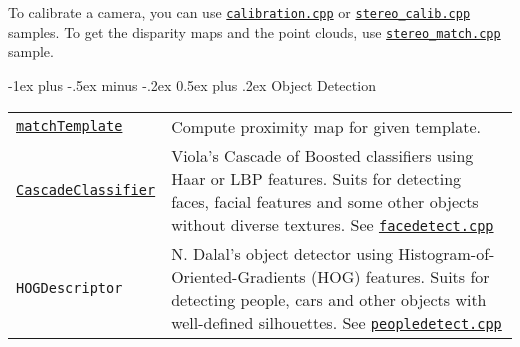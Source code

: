 \documentclass[10pt,landscape]{article}
\makeatletter
\renewcommand{\section}{\@startsection{section}{1}{0mm}%
                                {-1ex plus -.5ex minus -.2ex}%
                                {0.5ex plus .2ex}%
                                {\normalfont\large\bfseries}}
\makeatother
\begin{document}
\begin{multicols}{3}
\begin{tabular}{@{}p{\the\MyLen}%
                @{}p{\linewidth-\the\MyLen}@{}}
\end{tabular}

To calibrate a camera, you can use \texttt{\href{http://code.opencv.org/projects/opencv/repository/revisions/master/entry/samples/cpp/calibration.cpp}{calibration.cpp}} or
\texttt{\href{http://code.opencv.org/projects/opencv/repository/revisions/master/entry/samples/cpp/stereo\_calib.cpp}{stereo\_calib.cpp}} samples.
To get the disparity maps and the point clouds, use
\texttt{\href{http://code.opencv.org/projects/opencv/repository/revisions/master/entry/samples/cpp/stereo\_match.cpp}{stereo\_match.cpp}} sample.

\section{Object Detection}

\begin{tabular}{@{}p{\the\MyLen}%
                @{}p{\linewidth-\the\MyLen}@{}}
                \texttt{\href{http://docs.opencv.org/modules/imgproc/doc/object_detection.html\#matchtemplate}{matchTemplate}} & Compute proximity map for given template.\\

\texttt{\href{http://docs.opencv.org/modules/objdetect/doc/cascade_classification.html\#cascadeclassifier}{CascadeClassifier}} & Viola's Cascade of Boosted classifiers using Haar or LBP features. Suits for detecting faces, facial features and some other objects without diverse textures. See \texttt{\href{http://code.opencv.org/projects/opencv/repository/revisions/master/entry/samples/c/facedetect.cpp}{facedetect.cpp}}\\

\texttt{{HOGDescriptor}} & N. Dalal's object detector using Histogram-of-Oriented-Gradients (HOG) features. Suits for detecting people, cars and other objects with well-defined silhouettes. See \texttt{\href{http://code.opencv.org/projects/opencv/repository/revisions/master/entry/samples/cpp/peopledetect.cpp}{peopledetect.cpp}}\\

\end{tabular}

%
%
%

\end{multicols}
\end{document}
